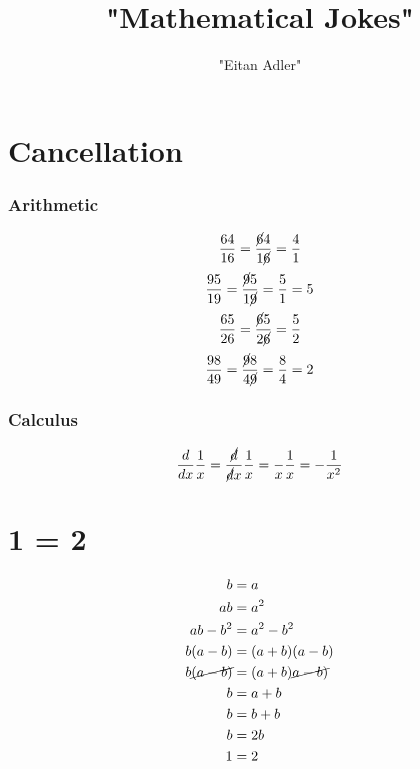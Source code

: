 \documentclass{article}
\title {"Mathematical Jokes"}
\author {"Eitan Adler"}
\begin{document}
\maketitle


\section{Cancellation}
\subsubsection{Arithmetic}
\begin{equation}
	\begin{split}
		\frac{64}{16}
		=
		\frac{\cancel{6}4}{1\cancel{6}}
		=
		\frac{4}{1}
	\end{split}
\end{equation}
\begin{equation}
	\begin{split}
		\frac{95}{19}
		=
		\frac{\cancel{9}5}{1\cancel{9}}
		=
		\frac{5}{1}
		=
		5
	\end{split}
\end{equation}
\begin{equation}
	\begin{split}
		\frac{65}{26}
		=
		\frac{\cancel{6}5}{2\cancel{6}}
		=
		\frac{5}{2}
	\end{split}
\end{equation}
\begin{equation}
	\begin{split}
		\frac{98}{49}
		=
		\frac{\cancel{9}8}{4\cancel{9}}
		=
		\frac{8}{4}
		=
		2
	\end{split}
\end{equation}

\subsubsection{Calculus}
\begin{equation}
	\begin{split}
		\frac{d}{dx}
		\frac{1}{x}
		=
		\frac{\cancel{d}}{\cancel{d}x}
		\frac{1}{x}
		=
		\frac{}{x}
		\frac{1}{x}
		=
		- \frac{1}{x^2}
	\end{split}
\end{equation}

\section{1 = 2}

\begin{equation}
	\begin{split}
		b        &= a \\
		ab       &= a^2 \\
		ab - b^2 &= a^2 - b^2 \\
		b(a - b) &= (a + b)(a - b) \\
		b\cancel{(a - b)} &= (a + b)\cancel{a - b)} \\
		b        &= a + b \\
		b        &= b + b \\
		b        &= 2b \\
		1        &= 2
	\end{split}
\end{equation}
\end{document}
